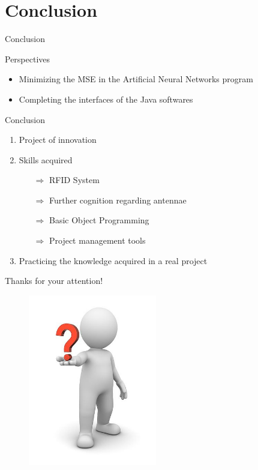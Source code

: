 \documentclass[utf8,compress]{beamer}
\begin{document}
\section{Conclusion}


\begin{frame}[containsverbatim]{Conclusion}
\begin{block}{Perspectives}
\begin{itemize}
\vspace{1em} 
    \item Minimizing the MSE in the Artificial Neural Networks program 
\vspace{1em} 
    \item Completing the interfaces of the Java softwares
\vspace{1em} 
\end{itemize}
\end{block}


\end{frame}



\begin{frame}{Conclusion}
\begin{block}{ }
    \begin{enumerate}
	 \item  Project  of innovation
\vspace{1em} 
	\item Skills acquired
 		\begin{itemize}
\item[$\Rightarrow$] RFID System
\vspace{0.5em} 
\item[$\Rightarrow$] Further cognition regarding antennae
\vspace{0.5em} 
\item[$\Rightarrow$] Basic Object Programming
\vspace{0.5em} 
	\item[$\Rightarrow$] Project management tools
\vspace{0.5em} 
	
	  \end{itemize}
\vspace{1em} 
     \item Practicing the knowledge acquired in a real project
   \end{enumerate}
\end{block}
\end{frame}

\begin{frame}{Thanks for your attention!}
\begin{figure}[h]
    \center
    \includegraphics[width=0.5\textwidth]{ques.jpg}
\end{figure}
\end{frame}
\end{document}

